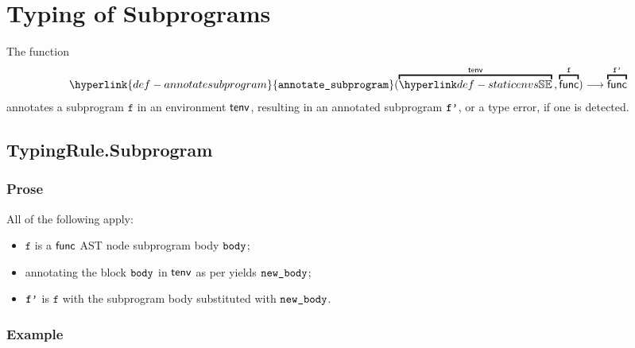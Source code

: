 \documentclass{book}
\newcommand\ProseOrTypeError[0]{\ProseTerminateAs{\TypeErrorConfig}}
\newcommand\annotatesubprogram[1]{\hyperlink{def-annotatesubprogram}{\texttt{annotate\_subprogram}}(#1)}
\newcommand\vf[0]{\texttt{f}}
\begin{document}
\chapter{Typing of Subprograms \label{chap:TypingSubprograms}}
\hypertarget{def-annotatesubprogram}{}
The function
\[
  \annotatesubprogram{\overname{\staticenvs}{\tenv} \aslsep \overname{\func}{\vf}} \aslto \overname{\func}{\vfp}
\]
annotates a subprogram $\vf$ in an environment $\textsf{tenv}$, resulting in an annotated subprogram $\texttt{f'}$,
or a type error, if one is detected.

\section{TypingRule.Subprogram \label{sec:TypingRule.Subprogram}}

\subsection{Prose}
All of the following apply:
\begin{itemize}
  \item $\vf$ is a $\textsf{func}$ AST node subprogram body $\texttt{body}$;
  \item annotating the block $\texttt{body}$ in $\textsf{tenv}$ as per  yields $\texttt{new\_body}$\ProseOrTypeError;
  \item $\texttt{f'}$ is $\vf$ with the subprogram body substituted with $\texttt{new\_body}$.
\end{itemize}

\subsection{Example}

\end{document}
